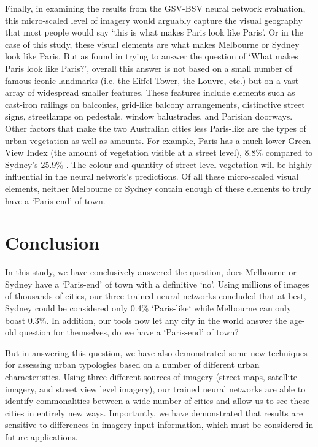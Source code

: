 \documentclass[sageh,times]{sagej}
\begin{document}
Finally, in examining the results from the GSV-BSV neural network evaluation, this micro-scaled level of imagery would arguably capture the visual geography that most people would say `this is what makes Paris look like Paris'. Or in the case of this study, these visual elements are what makes Melbourne or Sydney look like Paris. But as \cite{Doersch2012} found in trying to answer the question of `What makes Paris look like Paris?', overall this answer is not based on a small number of famous iconic landmarks (i.e. the Eiffel Tower, the Louvre, etc.) but on a vast array of widespread smaller features. These features include elements such as cast-iron railings on balconies, grid-like balcony arrangements, distinctive street signs, streetlamps on pedestals, window balustrades, and Parisian doorways. Other factors that make the two Australian cities less Paris-like are the types of urban vegetation as well as amounts. For example, Paris has a much lower Green View Index (the amount of vegetation visible at a street level), 8.8\% compared to Sydney's 25.9\% \citep{Li2015}. The colour and quantity of street level vegetation will be highly influential in the neural network's predictions. Of all these micro-scaled visual elements, neither Melbourne or Sydney contain enough of these elements to truly have a `Paris-end' of town.



\section{Conclusion}\label{sec:conclusion}

In this study, we have conclusively answered the question, does Melbourne or Sydney have a `Paris-end' of town with a definitive `no'. Using millions of images of thousands of cities, our three trained neural networks concluded that at best, Sydney could be considered only 0.4\% `Paris-like` while Melbourne can only boast 0.3\%. In addition, our tools now let any city in the world answer the age-old question for themselves, do we have a `Paris-end' of town?

But in answering this question, we have also demonstrated some new techniques for assessing urban typologies based on a number of different urban characteristics. Using three different sources of imagery (street maps, satellite imagery, and street view level imagery), our trained neural networks are able to identify commonalities between a wide number of cities and allow us to see these cities in entirely new ways. Importantly, we have demonstrated that results are sensitive to differences in imagery input information, which must be considered in future applications. 
\end{document}
